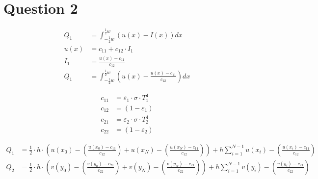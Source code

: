 \newpage
\section*{Question 2}




\begin{equation}
\begin{align*}
Q_{ 1 }&=\int _{ -\frac { 1 }{ 2 } w }^{ \frac { 1 }{ 2 } w } \left( { u }\left( x \right) -I\left( x \right)  \right) { dx }\\ 
u\left( x \right) &={ c }_{ 11 }+{ c }_{ 12 }\cdot I_{ 1 }\\ 
{ I }_{ 1 }&=\frac { u\left( x \right) -{ c }_{ 11 } }{ { c }_{ 12 } } \\ 
Q_{ 1 }&=\int _{ -\frac { 1 }{ 2 } w }^{ \frac { 1 }{ 2 } w } \left( { u }\left( x \right) -\frac { u\left( x \right) -{ c }_{ 11 } }{ { c }_{ 12 } }  \right) { dx }
\end{align*}
\label{eq:ss}
\end{equation}


\begin{equation}
\begin{align*}
{ c }_{ 11 }&={ \varepsilon  }_{ 1 }\cdot \sigma \cdot { T }_{ 1 }^{ 4 }\\ 
{ c }_{ 12 }&=\left( 1-{ \varepsilon  }_{ 1 } \right) \\ 
{ c }_{ 21 }&={ \varepsilon  }_{ 2 }\cdot \sigma \cdot { T }_{ 2 }^{ 4 }\\ 
{ c }_{ 22 }&=\left( 1-{ \varepsilon  }_{ 2 } \right) 
\end{align*}
\label{eq:ad}
\end{equation}



\begin{equation}
\begin{align*}
{ Q }_{ 1 }&=\frac { 1 }{ 2 } \cdot h\cdot \left( u\left( { x }_{ 0 } \right) -\left( \frac { u\left( { x }_{ 0 } \right) -{ c }_{ 11 } }{ { c }_{ 12 } }  \right) +u\left( { x }_{ N } \right) -\left( \frac { u\left( { x }_{ N } \right) -{ c }_{ 11 } }{ { c }_{ 12 } }  \right)  \right) +h\sum _{ i=1 }^{ N-1 }{ u\left( { x }_{ i } \right) - } \left( \frac { u\left( { x }_{ i } \right) -{ c }_{ 11 } }{ { c }_{ 12 } }  \right) \\
{ Q }_{ 2 }&=\frac { 1 }{ 2 } \cdot h\cdot \left( v\left( { y }_{ 0 } \right) -\left( \frac { v\left( { y }_{ 0 } \right) -{ c }_{ 21 } }{ { c }_{ 22 } }  \right) +v\left( { y }_{ N } \right) -\left( \frac { v\left( { y }_{ N } \right) -{ c }_{ 21 } }{ { c }_{ 22 } }  \right)  \right) +h\sum _{ i=1 }^{ N-1 }{ v\left( { y }_{ i } \right) - } \left( \frac { v\left( { y }_{ i } \right) -{ c }_{ 21 } }{ { c }_{ 22 } }  \right)  
\end{align*}
\label{eq:Q12}
\end{equation}


